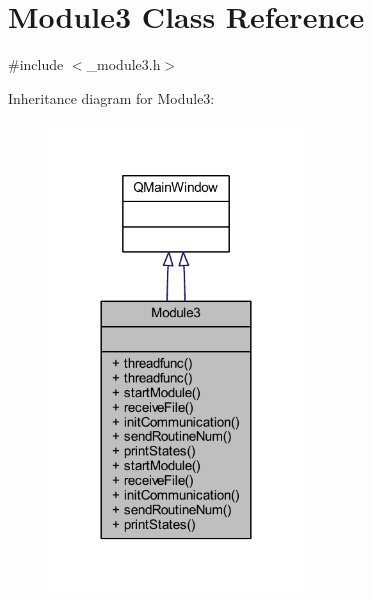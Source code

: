 \hypertarget{class_module3}{}\section{Module3 Class Reference}
\label{class_module3}


{\ttfamily \#include $<$\+\_\+module3.\+h$>$}



Inheritance diagram for Module3\+:
\nopagebreak
\begin{figure}[H]
\begin{center}
\leavevmode
\includegraphics[width=192pt]{class_module3__inherit__graph}
\end{center}
\end{figure}


